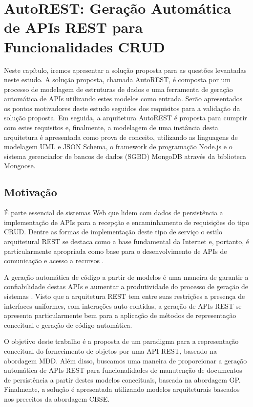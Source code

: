 \chapter{AutoREST: Geração Automática de APIs REST para Funcionalidades CRUD}
\label{chap:autorest}

Neste capítulo, iremos apresentar a solução proposta para as questões levantadas neste estudo. A solução proposta, chamada AutoREST, é composta por um processo de modelagem de estruturas de dados e uma ferramenta de geração automática de APIs utilizando estes modelos como entrada. Serão apresentados os pontos motivadores deste estudo seguidos dos requisitos para a validação da solução proposta. Em seguida, a arquitetura AutoREST é proposta para cumprir com estes requisitos e, finalmente, a modelagem de uma instância desta arquitetura é apresentada como prova de conceito, utilizando as linguagens de modelagem UML e JSON Schema, o framework de programação Node.js e o sistema gerenciador de bancos de dados (SGBD) MongoDB através da biblioteca Mongoose.


\section{Motivação}

É parte essencial de sistemas Web que lidem com dados de persistência a implementação de APIs para a recepção e encaminhamento de requisições do tipo CRUD. Dentre as formas de implementação deste tipo de serviço o estilo arquitetural REST se destaca como a base fundamental da Internet e, portanto, é particularmente apropriada como base para o desenvolvimento de APIs de comunicação e acesso a recursos \cite{FIELDING:2000}.

A geração automática de código a partir de modelos é uma maneira de garantir a confiabilidade destas APIs e aumentar a produtividade do processo de geração de sistemas \cite{SELIC:2003}. Visto que a arquitetura REST tem entre suas restrições a presença de interfaces uniformes, com interações auto-contidas, a geração de APIs REST se apresenta particularmente bem para a aplicação de métodos de representação conceitual e geração de código automática.

O objetivo deste trabalho é a proposta de um paradigma para a representação conceitual do fornecimento de objetos por uma API REST, baseado na abordagem MDD. Além disso, buscamos uma maneira de proporcionar a geração automática de APIs REST para funcionalidades de manutenção de documentos de persistência a partir destes modelos conceituais, baseada na abordagem GP. Finalmente, a solução é apresentada utilizando modelos arquiteturais baseados nos preceitos da abordagem CBSE.

